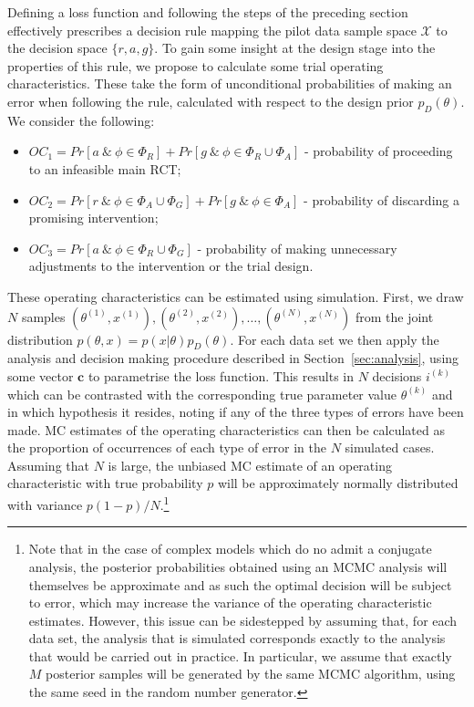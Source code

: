 \documentclass[AMA,STIX1COL]{WileyNJD-v2}
\begin{document}
Defining a loss function and following the steps of the preceding section effectively prescribes a decision rule mapping the pilot data sample space $\mathcal{X}$ to the decision space $\{r, a, g\}$. To gain some insight at the design stage into the properties of this rule, we propose to calculate some trial operating characteristics. These take the form of unconditional probabilities of making an error when following the rule, calculated with respect to the design prior $p_D(\theta)$. We consider the following:
\begin{itemize}
\item $OC_1 = Pr[a ~\&~ \phi \in \Phi_R] + Pr[g ~\&~ \phi \in \Phi_R \cup \Phi_A]$ - probability of proceeding to an infeasible main RCT;
\item $OC_2 = Pr[r ~\&~ \phi \in \Phi_A \cup \Phi_G] + Pr[g ~\&~ \phi \in \Phi_A]$ - probability of discarding a promising intervention;
\item $OC_3 = Pr[a ~\&~ \phi \in \Phi_R \cup \Phi_G]$ - probability of making unnecessary adjustments to the intervention or the trial design.
\end{itemize}

These operating characteristics can be estimated using simulation. First, we draw $N$ samples $(\theta^{(1)}, x^{(1)}), (\theta^{(2)}, x^{(2)}), \ldots , (\theta^{(N)}, x^{(N)})$ from the joint distribution $p(\theta, x) = p(x | \theta)p_D(\theta)$. For each data set we then apply the analysis and decision making procedure described in Section~\ref{sec:analysis}, using some vector $\mathbf{c}$ to parametrise the loss function. This results in $N$ decisions $i^{(k)}$ which can be contrasted with the corresponding true parameter value $\theta^{(k)}$ and in which hypothesis it resides, noting if any of the three types of errors have been made. MC estimates of the operating characteristics can then be calculated as the proportion of occurrences of each type of error in the $N$ simulated cases. Assuming that $N$ is large, the unbiased MC estimate of an operating characteristic with true probability $p$ will be approximately normally distributed with variance $p(1-p)/N$.\footnote{Note that in the case of complex models which do no admit a conjugate analysis, the posterior probabilities obtained using an MCMC analysis will themselves be approximate and as such the optimal decision will be subject to error, which may increase the variance of the operating characteristic estimates. However, this issue can be sidestepped by assuming that, for each data set, the analysis that is simulated corresponds exactly to the analysis that would be carried out in practice. In particular, we assume that exactly $M$ posterior samples will be generated by the same MCMC algorithm, using the same seed in the random number generator.}
\end{document}
